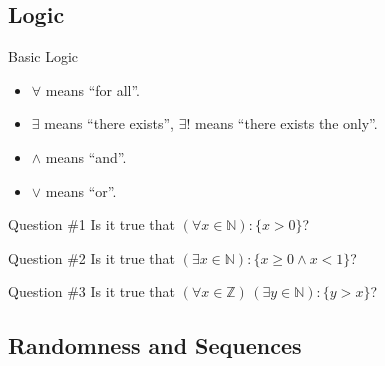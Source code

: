 \documentclass{beamer}
\begin{document}
    \subsection{Logic}
    \begin{frame}{Basic Logic}
        \begin{itemize}
          \item $\forall$ means ``for all''.
          \item $\exists$ means ``there exists'', $\exists!$ means ``there exists the only''.
          \item $\land$ means ``and''.
          \item $\lor$ means ``or''.
        \end{itemize}

        \begin{alertblock}{Question \#1}
            Is it true that $(\forall x \in \mathbb{N}): \{x > 0\}$?
        \end{alertblock}

        \begin{alertblock}{Question \#2}
            Is it true that $(\exists x \in \mathbb{N}): \{x \geq 0 \land x < 1\}$?
        \end{alertblock}

        \begin{alertblock}{Question \#3}
            Is it true that $(\forall x \in \mathbb{Z})\, (\exists y \in \mathbb{N}): \{y > x\}$?
        \end{alertblock}
    \end{frame}

    \subsection{Randomness and Sequences}
\end{document}
